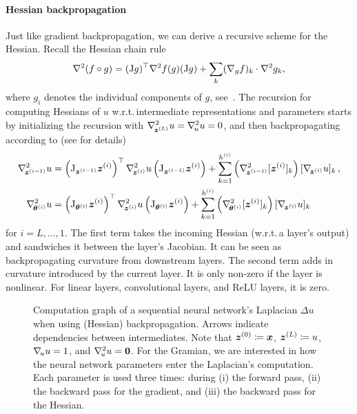 \paragraph{Hessian backpropagation} Just like gradient backpropagation, we can derive a recursive scheme for the Hessian.
Recall the Hessian chain rule
\begin{equation}\label{eq:hessianChainRule}
  \nabla^2 (f\circ g)
  =
  (\mathrm{J} g)^\top \nabla^2 f(g) (\mathrm{J} g)
  +
  \sum_k (\nabla_g f)_k \cdot \nabla^2 g_k,
\end{equation}
where $g_i$ denotes the individual components of $g$, see~\cite{skorski2019chain}.
The recursion for computing Hessians of $u$
w.r.t.\,intermediate representations and parameters starts by initializing the
recursion with $\nabla_{\!{{\bm{z}}^{(L)}}}^{2}u = \nabla_{\!{u}}^{2} u = 0$, and then
backpropagating according to (see \citet{dangel2020modular} for details)
\begin{align}\label{eq:hessian-backpropagation}
  \begin{split}
    \gradsquared{\vz^{(i-1)}}u
    &=
      \left( \jac_{\vz^{(i-1)}} \vz^{(i)} \right)^{\top}
      \gradsquared{\vz^{(i)}}u
      \left( \jac_{\vz^{(i-1)}} \vz^{(i)} \right)
      +
      \sum_{k=1}^{h^{(i)}}
      \left(
      \gradsquared{\vz^{(i-1)}} [\vz^{(i)}]_k
      \right)
      [\grad{\vz^{(i)}} u]_k\,,
    \\
    \gradsquared{\vtheta^{(i)}}u
    &=
      \left( \jac_{\vtheta^{(i)}} \vz^{(i)} \right)^{\top}
      \gradsquared{\vz^{(i)}}u
      \left( \jac_{\vtheta^{(i)}} \vz^{(i)} \right)
      +
      \sum_{k=1}^{h^{(i)}}
      \left(
      \gradsquared{\vtheta^{(i)}} [\vz^{(i)}]_k
      \right)
      [\grad{\vz^{(i)}} u]_k
  \end{split}
\end{align}
for $i = L, \dots, 1$.
The first term takes the incoming Hessian (w.r.t.\,a layer's output) and sandwiches it between the layer's Jacobian.
It can be seen as backpropagating curvature from downstream layers.
The second term adds in curvature introduced by the current layer.
It is only non-zero if the layer is nonlinear.
For linear layers, convolutional layers, and ReLU layers, it is zero.

\begin{figure}[t]
  \centering
  \resizebox{\linewidth}{!}{%
    
  }
  \caption{Computation graph of a sequential neural network's Laplacian $\Delta u$ when using (Hessian) backpropagation.
    Arrows indicate dependencies between intermediates.
    Note that ${\bm{z}}^{(0)} \coloneqq {\bm{x}}$, ${\bm{z}}^{(L)} \coloneqq u$, $\nabla_{\!{u}}u = 1$, and $\nabla_{\!{u}}^{2}u = {\bm{0}}$.
    For the Gramian, we are interested in how the neural network parameters enter the Laplacian's computation. Each parameter is used three times: during (i) the forward pass, (ii) the backward pass for the gradient, and (iii) the backward pass for the Hessian.}\label{fig:hbp-dependencies}
\end{figure}

